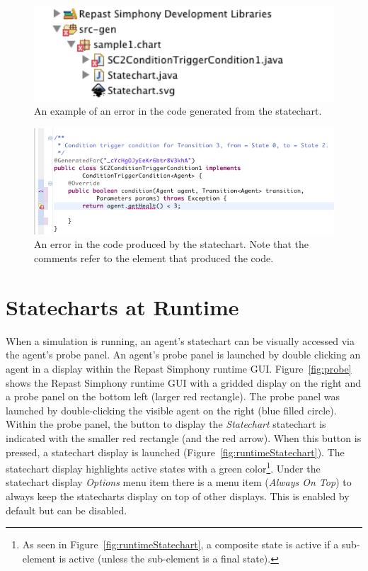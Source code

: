 \documentclass[11pt]{amsart}
\begin{document}
\begin{figure}
\begin{center}
\vspace{.2in}
\centerline {
\includegraphics[width=5in]{StatechartsImages/srcgen_error.png}
}
\caption{An example of an error in the code generated from the statechart.}
\label{fig:srcgen}
\end{center}
\end{figure}

\begin{figure}
\begin{center}
\vspace{.2in}
\centerline {
\includegraphics[width=5.5in]{StatechartsImages/code_error.png}
}
\caption{An error in the code produced by the statechart. Note that the comments refer to the element that produced the code.}
\label{fig:codeerror}
\end{center}
\end{figure}


\section{Statecharts at Runtime}
\label{sec:runtime}
When a simulation is running, an agent's statechart can be visually accessed via the agent's probe panel. An agent's probe panel is launched by double clicking an agent in a display within the Repast Simphony runtime GUI. Figure~\ref{fig:probe} shows the Repast Simphony runtime GUI with a gridded display on the right and a probe panel on the bottom left (larger red rectangle). The probe panel was launched by double-clicking the visible agent on the right (blue filled circle). Within the probe panel, the button to display the \emph{Statechart} statechart is indicated with the smaller red rectangle (and the red arrow). When this button is pressed, a statechart display is launched (Figure~\ref{fig:runtimeStatechart}). The statechart display highlights active states with a green color\footnote{As seen in Figure~\ref{fig:runtimeStatechart}, a composite state is active if a sub-element is active (unless the sub-element is a final state).}. Under the statechart display \emph{Options} menu item there is a menu item (\emph{Always On Top}) to always keep the statecharts display on top of other displays. This is enabled by default but can be disabled.
\end{document}
